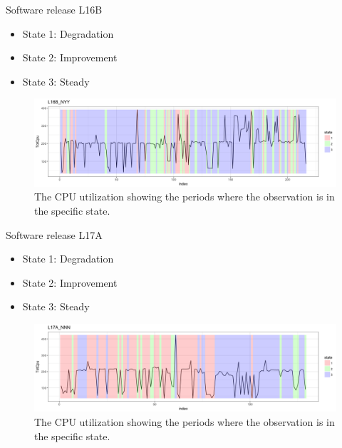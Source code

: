 \documentclass{beamer}
\begin{document}
\begin{frame}
Software release L16B

\begin{itemize}
	\item State 1: Degradation
	\item State 2: Improvement
	\item State 3: Steady
\end{itemize}

\begin{figure}
	\includegraphics[width=1\linewidth]{L16B_NYY1}
	\caption{The CPU utilization showing the periods where the observation is in the specific state.}
\end{figure}

\end{frame}

\begin{frame}
Software release L17A

\begin{itemize}
	\item State 1: Degradation
	\item State 2: Improvement
	\item State 3: Steady
\end{itemize}

\begin{figure}
	\includegraphics[width=1\linewidth]{L17A_NNN1}
	\caption{The CPU utilization showing the periods where the observation is in the specific state.}
\end{figure}

\end{frame}
\end{document}
